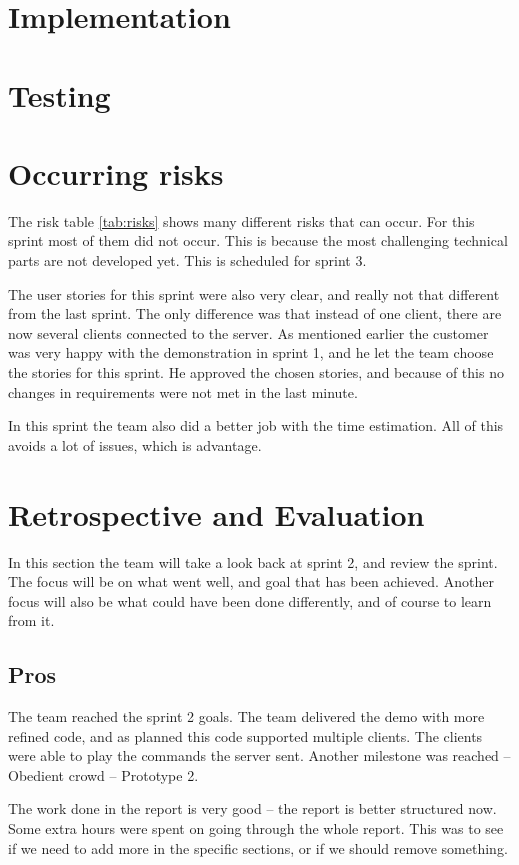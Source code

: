 \section{Implementation}
\section{Testing}
\section{Occurring risks}

The risk table \ref{tab:risks} shows many different risks that can occur. 
For this sprint most of them did not occur. 
This is because the most challenging technical parts are not developed yet. 
This is scheduled for sprint 3. 

The user stories for this sprint were also very clear, and really not that different from the last sprint. 
The only difference was that instead of one client, there are now several clients connected to the server. 
As mentioned earlier the customer was very happy with the demonstration in sprint 1, and he let the team choose the stories for this sprint. 
He approved the chosen stories, and because of this no changes in requirements were not met in the last minute.
 
In this sprint the team also did a better job with the time estimation. 
All of this avoids a lot of issues, which is advantage. 
  

\section{Retrospective and Evaluation}
In this section the team will take a look back at sprint 2, and review the sprint. 
The focus will be on what went well, and goal that has been achieved. 
Another focus will also be what could have been done differently, and of course to learn from it.

\subsection{Pros}
The team reached the sprint 2 goals. 
The team delivered the demo with more refined code, and as planned this code supported multiple clients. 
The clients were able to play the commands the server sent.
Another milestone was reached -- Obedient crowd -- Prototype 2.

The work done in the report is very good -- the report is better structured now.
Some extra hours were spent on going through the whole report. 
This was to see if we need to add more in the specific sections, or if we should remove something.  

